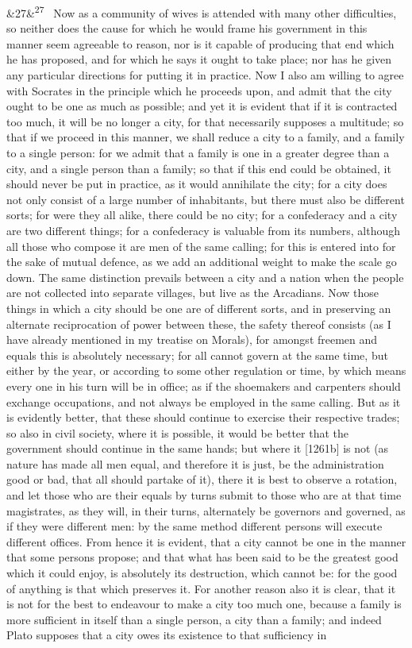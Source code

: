 \documentclass[12pt]{article}
\newcommand{\para}[1][]{\par\noindent\ifx&#1&\else\textsuperscript{\footnotesize #1}~\fi}
\begin{document}
\para[27] Now as a community of wives is attended with many other difficulties, so neither does the cause for which he would frame his government in this manner seem agreeable to reason, nor is it capable of producing that end which he has proposed, and for which he says it ought to take place; nor has he given any particular directions for putting it in practice. Now I also am willing to agree with Socrates in the principle which he proceeds upon, and admit that the city ought to be one as much as possible; and yet it is evident that if it is contracted too much, it will be no longer a city, for that necessarily supposes a multitude; so that if we proceed in this manner, we shall reduce a city to a family, and a family to a single person: for we admit that a family is one in a greater degree than a city, and a single person than a family; so that if this end could be obtained, it should never be put in practice, as it would annihilate the city; for a city does not only consist of a large number of inhabitants, but there must also be different sorts; for were they all alike, there could be no city; for a confederacy and a city are two different things; for a confederacy is valuable from its numbers, although all those who compose it are men of the same calling; for this is entered into for the sake of mutual defence, as we add an additional weight to make the scale go down. The same distinction prevails between a city and a nation when the people are not collected into separate villages, but live as the Arcadians. Now those things in which a city should be one are of different sorts, and in preserving an alternate reciprocation of power between these, the safety thereof consists (as I have already mentioned in my treatise on Morals), for amongst freemen and equals this is absolutely necessary; for all cannot govern at the same time, but either by the year, or according to some other regulation or time, by which means every one in his turn will be in office; as if the shoemakers and carpenters should exchange occupations, and not always be employed in the same calling. But as it is evidently better, that these should continue to exercise their respective trades; so also in civil society, where it is possible, it would be better that the government should continue in the same hands; but where it [1261b] is not (as nature has made all men equal, and therefore it is just, be the administration good or bad, that all should partake of it), there it is best to observe a rotation, and let those who are their equals by turns submit to those who are at that time magistrates, as they will, in their turns, alternately be governors and governed, as if they were different men: by the same method different persons will execute different offices. From hence it is evident, that a city cannot be one in the manner that some persons propose; and that what has been said to be the greatest good which it could enjoy, is absolutely its destruction, which cannot be: for the good of anything is that which preserves it. For another reason also it is clear, that it is not for the best to endeavour to make a city too much one, because a family is more sufficient in itself than a single person, a city than a family; and indeed Plato supposes that a city owes its existence to that sufficiency in 
\end{document}
